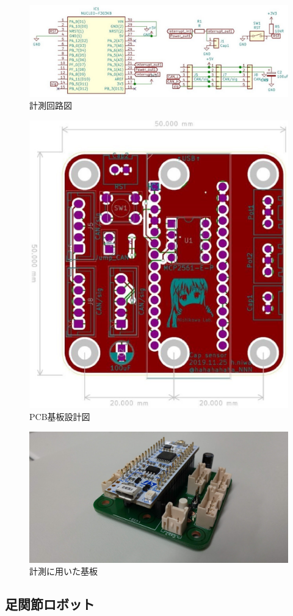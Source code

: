 \begin{figure}[h]
    \begin{center}
        \includegraphics[width=0.7\columnwidth,clip]{2_measurement/circuitPicture.eps}
        \caption{計測回路図}
        \label{fig:circuitPic}
    \end{center}
\end{figure}
\begin{figure}[h]
    \begin{center}
        \includegraphics[width=0.4\columnwidth,clip]{2_measurement/PCB.eps}
        \caption{PCB基板設計図}
        \label{fig:PCB}
    \end{center}
\end{figure}
\begin{figure}[h]
    \begin{center}
     \includegraphics[width=0.6\columnwidth,clip]{./2_measurement/circuit.eps}
     \caption{計測に用いた基板}
     \label{fig:circuit}
    \end{center}
\end{figure}

\subsection{足関節ロボット}

